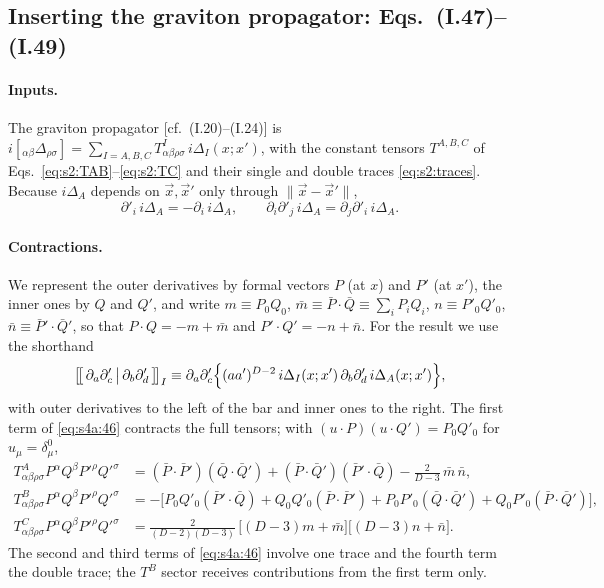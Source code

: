 \documentclass[aps,prd,onecolumn,10pt,nofootinbib,floatfix]{revtex4-2}
\newcommand{\eqI}[1]{(I.#1)}
\begin{document}
\subsection{Inserting the graviton propagator: Eqs.~(I.47)--(I.49)}
\label{sec:s4a:graviton}

\paragraph*{Inputs.}
The graviton propagator [cf.\ \eqI{20}--\eqI{24}] is
$i[{}_{\alpha\beta}\Delta_{\rho\sigma}]=\sum_{I=A,B,C}T^I_{\alpha\beta\rho\sigma}\,i\Delta_I(x;x')$, with the
constant tensors $T^{A,B,C}$ of Eqs.~\eqref{eq:s2:TAB}--\eqref{eq:s2:TC} and their single and double traces
\eqref{eq:s2:traces}. Because $i\Delta_A$ depends on $\vec x,\vec x'$
only through $\|\vec x-\vec x'\|$,
\begin{equation}
\partial'_i\,i\Delta_A=-\partial_i\,i\Delta_A,\qquad \partial_i\partial'_j\,i\Delta_A=\partial_j\partial'_i\,i\Delta_A .
\label{eq:s4a:hom}
\end{equation}

\paragraph*{Contractions.}
We represent the outer derivatives by formal vectors $P$ (at $x$) and $P'$ (at $x'$), the inner ones
by $Q$ and $Q'$, and write $m\equiv P_0Q_0$, $\bar m\equiv\bar P\!\cdot\!\bar Q\equiv\sum_iP_iQ_i$,
$n\equiv P'_0Q'_0$, $\bar n\equiv\bar P'\!\cdot\!\bar Q'$, so that $P\!\cdot\!Q=-m+\bar m$ and
$P'\!\cdot\!Q'=-n+\bar n$. For the result we use the shorthand
\begin{equation}
\big[\!\big[\,\partial_a\partial'_c\,\big|\,\partial_b\partial'_d\,\big]\!\big]_{I}\equiv
\partial_a\partial'_c\Big\{(aa')^{D-2}\,i\Delta_I(x;x')\,\partial_b\partial'_d\,i\Delta_A(x;x')\Big\},
\label{eq:s4a:bracket}
\end{equation}
with outer derivatives to the left of the bar and inner ones to the right. The first term of
\eqref{eq:s4a:46} contracts the full tensors; with $(u\!\cdot\!P)(u\!\cdot\!Q')=P_0Q'_0$ for
$u_\mu=\delta^0_\mu$,
\begin{equation}
\begin{aligned}
T^A_{\alpha\beta\rho\sigma}P^\alpha Q^\beta P'^\rho Q'^\sigma&=(\bar P\!\cdot\!\bar P')(\bar Q\!\cdot\!\bar Q')
+(\bar P\!\cdot\!\bar Q')(\bar P'\!\cdot\!\bar Q)-\tfrac{2}{D-3}\,\bar m\,\bar n,\\
T^B_{\alpha\beta\rho\sigma}P^\alpha Q^\beta P'^\rho Q'^\sigma&=-\big[P_0Q'_0(\bar P'\!\cdot\!\bar Q)+Q_0Q'_0(\bar P\!\cdot\!\bar P')
+P_0P'_0(\bar Q\!\cdot\!\bar Q')+Q_0P'_0(\bar P\!\cdot\!\bar Q')\big],\\
T^C_{\alpha\beta\rho\sigma}P^\alpha Q^\beta P'^\rho Q'^\sigma&=\tfrac{2}{(D-2)(D-3)}\,\big[(D-3)m+\bar m\big]\big[(D-3)n+\bar n\big].
\end{aligned}
\label{eq:s4a:c1}
\end{equation}
The second and third terms of \eqref{eq:s4a:46} involve one trace and the fourth term the double trace;
the $T^B$ sector receives contributions from the first term only.
\end{document}
